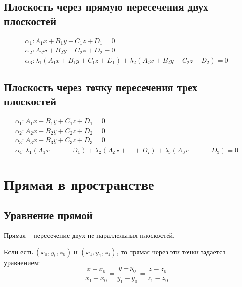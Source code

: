 \section{Плоскость через прямую пересечения двух плоскостей}

\begin{definition}
    \begin{gather*}
        \alpha_1: A_1x + B_1 y + C_1 z + D_1 = 0\\
        \alpha_2: A_2x + B_2 y + C_2 z + D_2 = 0\\
        \alpha_3: \lambda_1(A_1x + B_1 y + C_1 z + D_1) + \lambda_2(A_2x + B_2 y + C_2 z + D_2) = 0
    \end{gather*}
\end{definition}

\section{Плоскость через точку пересечения трех плоскостей}

\begin{definition}
    \begin{gather*}
        \alpha_1: A_1x + B_1 y + C_1 z + D_1 = 0\\
        \alpha_2: A_2x + B_2 y + C_2 z + D_2 = 0\\
        \alpha_3: A_3x + B_3 y + C_3 z + D_3 = 0\\
        \alpha_4: \lambda_1(A_1x + \ldots + D_1) + \lambda_2(A_2x + \ldots + D_2) + \lambda_3(A_3x + \ldots + D_3) = 0
    \end{gather*}
\end{definition}

\chapter{Прямая в пространстве}

\section{Уравнение прямой}

\begin{definition}
    Прямая -- пересечение двух не параллельных плоскостей.
\end{definition}


\begin{definition}
    Если есть $(x_0, y_0, z_0)$ и $(x_1, y_1, z_1)$, то прямая через эти точки задается уравнением:
    \[\frac{x-x_0}{x_1-x_0} = \frac{y-y_0}{y_1-y_0} = \frac{z-z_0}{z_1-z_0}\]
\end{definition}

